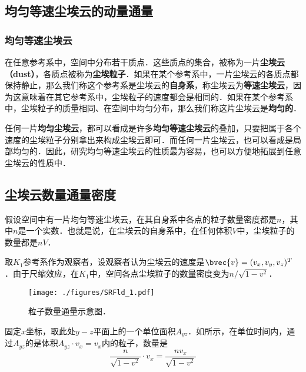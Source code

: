 


\subsection{均匀等速尘埃云的动量通量}

\subsubsection{均匀等速尘埃云}

在任意参考系中，空间中分布若干质点．这些质点的集合，被称为一片\textbf{尘埃云（dust）}，各质点被称为\textbf{尘埃粒子}．如果在某个参考系中，一片尘埃云的各质点都保持静止，那么我们称这个参考系是尘埃云的\textbf{自身系}，称尘埃云为\textbf{等速尘埃云}，因为这意味着在其它参考系中，尘埃粒子的速度都会是相同的．如果在某个参考系中，尘埃粒子的质量相同、在空间中均匀分布，那么我们称这片尘埃云是\textbf{均匀的}．

任何一片\textbf{均匀尘埃云}，都可以看成是许多\textbf{均匀等速尘埃云}的叠加，只要把属于各个速度的尘埃粒子分别拿出来构成尘埃云即可．而任何一片尘埃云，也可以看成是局部均匀的．因此，研究均匀等速尘埃云的性质最为容易，也可以方便地拓展到任意尘埃云的性质中．

\subsection{尘埃云数量通量密度}

假设空间中有一片均匀等速尘埃云，在其自身系中各点的粒子数量密度都是$n$，其中$n$是一个实数．也就是说，在尘埃云的自身系中，在任何体积$V$中，尘埃粒子的数量都是$nV$．

取$K_1$参考系作为观察者，设观察者认为尘埃云的速度是$\bvec{v}=(v_x, v_y, v_z)^T$．由于尺缩效应，在$K_1$中，空间各点尘埃粒子的数量密度变为$n/\sqrt{1-v^2}$．

\begin{figure}[ht]
\centering
\texttt{[image: ./figures/SRFld\_1.pdf]}
\caption{粒子数量通量示意图．} \label{SRFld_fig1}
\end{figure}

固定$x$坐标，取此处$y-z$平面上的一个单位面积$A_{yz}$．如所示，在单位时间内，通过$A_{yz}$的是体积$A_{yz}\cdot v_x=v_x$内的粒子，数量是
\begin{equation}
\frac{n}{\sqrt{1-v^2}}\cdot v_x=\frac{nv_x}{\sqrt{1-v^2}}
\end{equation}


